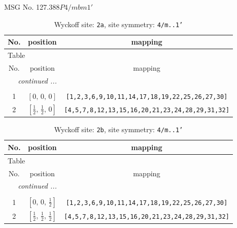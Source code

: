 \documentclass[fleqn,8pt]{jsarticle}
\begin{document}
\setcounter{MaxMatrixCols}{32}

\renewcommand{\tablename}{Table~}
\renewcommand{\figurename}{Figure~}
\begin{center}
\LARGE
MSG No. 127.388\quad$P4/mbm1'$
\end{center}
\renewcommand{\arraystretch}{1.2}
\begin{longtable}{ccc}
\caption{Wyckoff site: {\tt 2a}, site symmetry: {\tt 4/m..1'}}
 \\
 \hline \hline
No. & position & mapping \\ \hline \endfirsthead

\multicolumn{2}{l}{\tablename\ \thetable{}} \\
 \hline \hline
No. & position & mapping \\ \hline \endhead

 \hline \hline
\multicolumn{2}{r}{\footnotesize\it continued ...} \\ \endfoot

 \hline \hline
\multicolumn{2}{r}{} \\ \endlastfoot

1 & $\left[ 0,\, 0,\, 0 \right]$ & {\tt [1,2,3,6,9,10,11,14,17,18,19,22,25,26,27,30]} \\ \hline
2 & $\left[ \frac{1}{2},\, \frac{1}{2},\, 0 \right]$ & {\tt [4,5,7,8,12,13,15,16,20,21,23,24,28,29,31,32]} \\
\end{longtable}
\renewcommand{\arraystretch}{1.2}
\begin{longtable}{ccc}
\caption{Wyckoff site: {\tt 2b}, site symmetry: {\tt 4/m..1'}}
 \\
 \hline \hline
No. & position & mapping \\ \hline \endfirsthead

\multicolumn{2}{l}{\tablename\ \thetable{}} \\
 \hline \hline
No. & position & mapping \\ \hline \endhead

 \hline \hline
\multicolumn{2}{r}{\footnotesize\it continued ...} \\ \endfoot

 \hline \hline
\multicolumn{2}{r}{} \\ \endlastfoot

1 & $\left[ 0,\, 0,\, \frac{1}{2} \right]$ & {\tt [1,2,3,6,9,10,11,14,17,18,19,22,25,26,27,30]} \\ \hline
2 & $\left[ \frac{1}{2},\, \frac{1}{2},\, \frac{1}{2} \right]$ & {\tt [4,5,7,8,12,13,15,16,20,21,23,24,28,29,31,32]} \\
\end{longtable}
\end{document}
